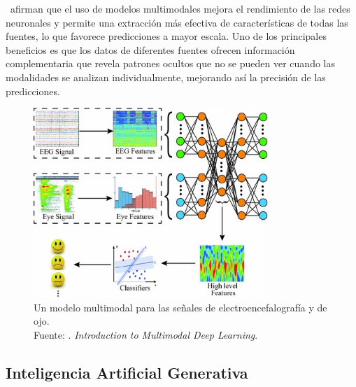 \cite{tec_baheti2020introduction_mdl} afirman que el uso de modelos multimodales mejora el rendimiento de las redes neuronales y permite una extracción más efectiva de características de todas las fuentes, lo que favorece predicciones a mayor escala. Uno de los principales beneficios es que los datos de diferentes fuentes ofrecen información complementaria que revela patrones ocultos que no se pueden ver cuando las modalidades se analizan individualmente, mejorando así la precisión de las predicciones.

\begin{figure}[!ht]
	\begin{center}
		\includegraphics[width=0.79\textwidth]{2/figures/multimodal_deep_learning_example.jpg}
		\caption[Un modelo multimodal para las señales de electroencefalografía y de ojo]{Un modelo multimodal para las señales de electroencefalografía y de ojo.\\
		Fuente: \cite{tec_baheti2020introduction_mdl}. \textit{Introduction to Multimodal Deep Learning}.}
		\label{2:fig7}
	\end{center}
\end{figure}

\subsection{Inteligencia Artificial Generativa}

